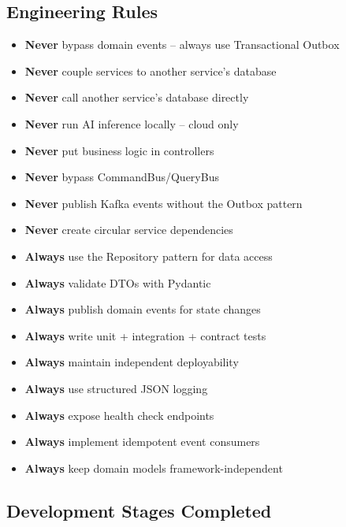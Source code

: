 \subsection{Engineering Rules}

\begin{itemize}
  \item \textbf{Never} bypass domain events -- always use Transactional Outbox
  \item \textbf{Never} couple services to another service's database
  \item \textbf{Never} call another service's database directly
  \item \textbf{Never} run AI inference locally -- cloud only
  \item \textbf{Never} put business logic in controllers
  \item \textbf{Never} bypass CommandBus/QueryBus
  \item \textbf{Never} publish Kafka events without the Outbox pattern
  \item \textbf{Never} create circular service dependencies
  \item \textbf{Always} use the Repository pattern for data access
  \item \textbf{Always} validate DTOs with Pydantic
  \item \textbf{Always} publish domain events for state changes
  \item \textbf{Always} write unit + integration + contract tests
  \item \textbf{Always} maintain independent deployability
  \item \textbf{Always} use structured JSON logging
  \item \textbf{Always} expose health check endpoints
  \item \textbf{Always} implement idempotent event consumers
  \item \textbf{Always} keep domain models framework-independent
\end{itemize}

\subsection{Development Stages Completed}


